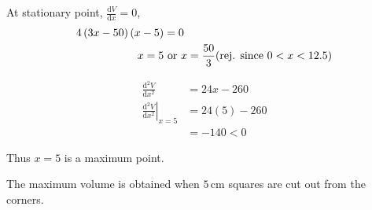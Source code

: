 \documentclass[11pt,a4paper]{book}
\begin{document}
\begin{example}
At stationary point, ${\displaystyle \frac{\mathrm{d}V}{\mathrm{d}x}=0}$,
\begin{align*}
4\left(3x-50\right)\left(x-5\right) & =0\\
x=5 & \text{ or }x=\frac{50}{3}\text{(rej. since \ensuremath{0<x<12.5})}
\end{align*}

\begin{align*}
\frac{{\mathrm{d}}^{2}V}{{\mathrm{d}}x^{2}} & =24x-260\\
\left.\frac{{\mathrm{d}}^{2}V}{{\mathrm{d}}x^{2}}\right|_{x=5} & =24\left(5\right)-260\\
 & =-140<0
\end{align*}

Thus $x=5$ is a maximum point.

The maximum volume is obtained when $5\,\text{cm}$ squares are cut
out from the corners.

\end{example}
\end{document}
